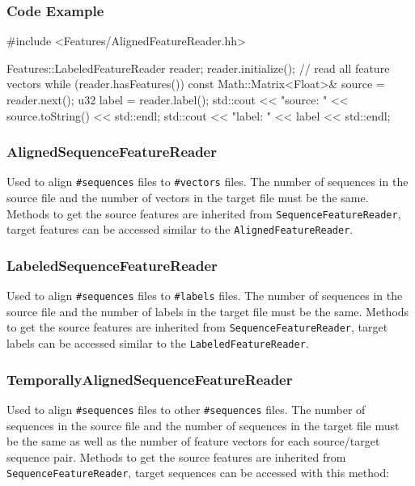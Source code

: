 \subsubsection*{Code Example}
\begin{code}
#include <Features/AlignedFeatureReader.hh>

Features::LabeledFeatureReader reader;
reader.initialize();
// read all feature vectors
while (reader.hasFeatures()) {
    const Math::Matrix<Float>& source = reader.next();
    u32 label = reader.label();
    std::cout << "source: " << source.toString() << std::endl;
    std::cout << "label: " << label << std::endl;
}
\end{code}


\subsubsection*{AlignedSequenceFeatureReader}

Used to align \texttt{\#sequences} files to \texttt{\#vectors} files. The number of sequences in the source file and the number of vectors in the target file must be the same.
Methods to get the source features are inherited from \texttt{SequenceFeatureReader}, target features can be accessed similar to the \texttt{AlignedFeatureReader}.

\subsubsection*{LabeledSequenceFeatureReader}

Used to align \texttt{\#sequences} files to \texttt{\#labels} files. The number of sequences in the source file and the number of labels in the target file must be the same.
Methods to get the source features are inherited from \texttt{SequenceFeatureReader}, target labels can be accessed similar to the \texttt{LabeledFeatureReader}.

\subsubsection*{TemporallyAlignedSequenceFeatureReader}

Used to align \texttt{\#sequences} files to other \texttt{\#sequences} files. The number of sequences in the source file and the number of sequences in the target file must be the same as well as the number of feature vectors for each source/target sequence pair.
Methods to get the source features are inherited from \texttt{SequenceFeatureReader}, target sequences can be accessed with this method:

